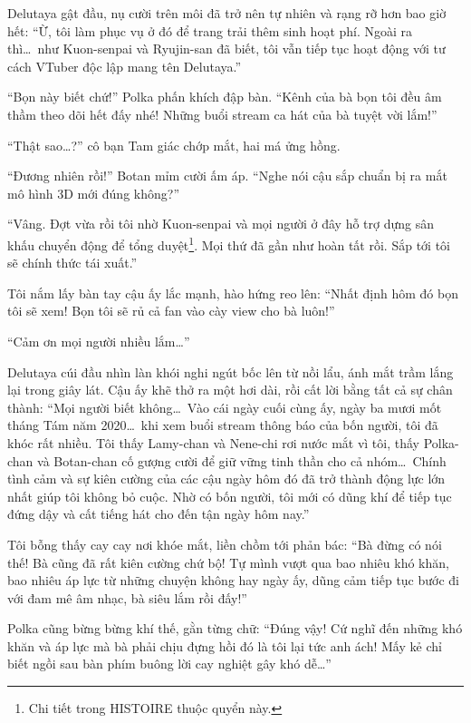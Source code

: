 \documentclass[../main.tex]{subfiles}
\begin{document}
Delutaya gật đầu, nụ cười trên môi đã trở nên tự nhiên và rạng rỡ hơn bao giờ hết: ``Ừ, tôi làm phục vụ ở đó để trang trải thêm sinh hoạt phí. Ngoài ra thì\dots\ như Kuon-senpai và Ryujin-san đã biết, tôi vẫn tiếp tục hoạt động với tư cách VTuber độc lập mang tên Delutaya.''

``Bọn này biết chứ!'' Polka phấn khích đập bàn. ``Kênh của bà bọn tôi đều âm thầm theo dõi hết đấy nhé! Những buổi stream ca hát của bà tuyệt vời lắm!''

``Thật sao\dots?'' cô bạn Tam giác chớp mắt, hai má ửng hồng.

``Đương nhiên rồi!'' Botan mỉm cười ấm áp. ``Nghe nói cậu sắp chuẩn bị ra mắt mô hình 3D mới đúng không?''

``Vâng. Đợt vừa rồi tôi nhờ Kuon-senpai và mọi người ở đây hỗ trợ dựng sân khấu chuyển động để tổng duyệt\footnote{Chi tiết trong {\flaregothic HISTOIRE } thuộc quyển này.}. Mọi thứ đã gần như hoàn tất rồi. Sắp tới tôi sẽ chính thức tái xuất.''

Tôi nắm lấy bàn tay cậu ấy lắc mạnh, hào hứng reo lên: ``Nhất định hôm đó bọn tôi sẽ xem! Bọn tôi sẽ rủ cả fan vào cày view cho bà luôn!''

``Cảm ơn mọi người nhiều lắm\dots''

Delutaya cúi đầu nhìn làn khói nghi ngút bốc lên từ nồi lẩu, ánh mắt trầm lắng lại trong giây lát. Cậu ấy khẽ thở ra một hơi dài, rồi cất lời bằng tất cả sự chân thành: ``Mọi người biết không\dots\ Vào cái ngày cuối cùng ấy, ngày ba mươi mốt tháng Tám năm 2020\dots\ khi xem buổi stream thông báo của bốn người, tôi đã khóc rất nhiều. Tôi thấy Lamy-chan và Nene-chi rơi nước mắt vì tôi, thấy Polka-chan và Botan-chan cố gượng cười để giữ vững tinh thần cho cả nhóm\dots\ Chính tình cảm và sự kiên cường của các cậu ngày hôm đó đã trở thành động lực lớn nhất giúp tôi không bỏ cuộc. Nhờ có bốn người, tôi mới có dũng khí để tiếp tục đứng dậy và cất tiếng hát cho đến tận ngày hôm nay.''

Tôi bỗng thấy cay cay nơi khóe mắt, liền chồm tới phản bác: ``Bà đừng có nói thế! Bà cũng đã rất kiên cường chứ bộ! Tự mình vượt qua bao nhiêu khó khăn, bao nhiêu áp lực từ những chuyện không hay ngày ấy, dũng cảm tiếp tục bước đi với đam mê âm nhạc, bà siêu lắm rồi đấy!''

Polka cũng bừng bừng khí thế, gằn từng chữ: ``Đúng vậy! Cứ nghĩ đến những khó khăn và áp lực mà bà phải chịu đựng hồi đó là tôi lại tức anh ách! Mấy kẻ chỉ biết ngồi sau bàn phím buông lời cay nghiệt gây khó dễ\dots''
\end{document}
